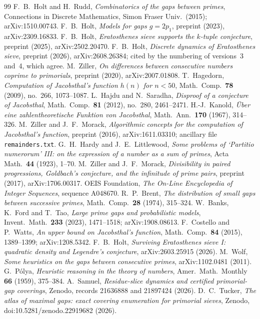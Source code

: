 \documentclass[11pt]{article}
\theoremstyle{definition}
\theoremstyle{remark}
\begin{document}
\begin{thebibliography}{99}
 F.~B.~Holt and H.~Rudd, \emph{Combinatorics of the gaps between primes}, Connections in Discrete Mathematics, Simon Fraser Univ.\ (2015); arXiv:1510.00743.
 F.~B.~Holt, \emph{Models for gaps $g = 2p_1$}, preprint (2023), arXiv:2309.16833.
 F.~B.~Holt, \emph{Eratosthenes sieve supports the $k$-tuple conjecture}, preprint (2025), arXiv:2502.20470.
 F.~B.~Holt, \emph{Discrete dynamics of Eratosthenes sieve}, preprint (2026), arXiv:2608.26384; cited by the numbering of versions~3 and~4, which agree.
 M.~Ziller, \emph{On differences between consecutive numbers coprime to primorials}, preprint (2020), arXiv:2007.01808.
 T.~Hagedorn, \emph{Computation of Jacobsthal's function $h(n)$ for $n < 50$}, Math.\ Comp.\ \textbf{78} (2009), no.~266, 1073--1087.
 L.~Hajdu and N.~Saradha, \emph{Disproof of a conjecture of Jacobsthal}, Math.\ Comp.\ \textbf{81} (2012), no.~280, 2461--2471.
 H.-J.~Kanold, \emph{\"Uber eine zahlentheoretische Funktion von Jacobsthal}, Math.\ Ann.\ \textbf{170} (1967), 314--326.
 M.~Ziller and J.~F.~Morack, \emph{Algorithmic concepts for the computation of Jacobsthal's function}, preprint (2016), arXiv:1611.03310; ancillary file \texttt{remainders.txt}.
 G.~H.~Hardy and J.~E.~Littlewood, \emph{Some problems of `Partitio numerorum' III: on the expression of a number as a sum of primes}, Acta Math.\ \textbf{44} (1923), 1--70.
 M.~Ziller and J.~F.~Morack, \emph{Divisibility in paired progressions, Goldbach's conjecture, and the infinitude of prime pairs}, preprint (2017), arXiv:1706.00317.
 OEIS Foundation, \emph{The On-Line Encyclopedia of Integer Sequences}, sequence A048670.
 R.~P.~Brent, \emph{The distribution of small gaps between successive primes}, Math.\ Comp.\ \textbf{28} (1974), 315--324.
 W.~Banks, K.~Ford and T.~Tao, \emph{Large prime gaps and probabilistic models}, Invent.\ Math.\ \textbf{233} (2023), 1471--1518; arXiv:1908.08613.
 F.~Costello and P.~Watts, \emph{An upper bound on Jacobsthal's function}, Math.\ Comp.\ \textbf{84} (2015), 1389--1399; arXiv:1208.5342.
 F.~B.~Holt, \emph{Surviving Eratosthenes sieve I: quadratic density and Legendre's conjecture}, arXiv:2603.25915 (2026).
 M.~Wolf, \emph{Some heuristics on the gaps between consecutive primes}, arXiv:1102.0481 (2011).
 G.~P\'olya, \emph{Heuristic reasoning in the theory of numbers}, Amer.\ Math.\ Monthly \textbf{66} (1959), 375--384.
 A.~Samuel, \emph{Residue-slice dynamics and certified primorial-gap coverings}, Zenodo, records 21636888 and 21897424 (2026).
 D.~C.~Tucker, \emph{The atlas of maximal gaps: exact covering enumeration for primorial sieves}, Zenodo, doi:10.5281/zenodo.22919682 (2026).
\end{thebibliography}
\end{document}
